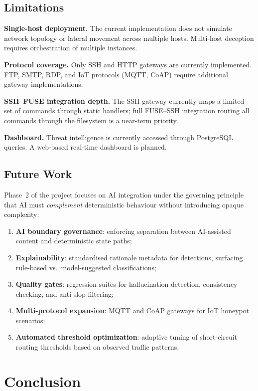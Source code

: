 \documentclass[conference]{IEEEtran}
\begin{document}
\subsection{Limitations}

\textbf{Single-host deployment.}
The current implementation does not simulate network topology or lateral movement across multiple hosts.
Multi-host deception requires orchestration of multiple instances.

\textbf{Protocol coverage.}
Only SSH and HTTP gateways are currently implemented.
FTP, SMTP, RDP, and IoT protocols (MQTT, CoAP) require additional gateway implementations.

\textbf{SSH--FUSE integration depth.}
The SSH gateway currently maps a limited set of commands through static handlers; full FUSE--SSH integration routing all commands through the filesystem is a near-term priority.

\textbf{Dashboard.}
Threat intelligence is currently accessed through PostgreSQL queries.
A web-based real-time dashboard is planned.

\subsection{Future Work}

Phase~2 of the project focuses on AI integration under the governing principle that AI must \emph{complement} deterministic behaviour without introducing opaque complexity:
\begin{enumerate}[noitemsep]
  \item \textbf{AI boundary governance}: enforcing separation between AI-assisted content and deterministic state paths;
  \item \textbf{Explainability}: standardised rationale metadata for detections, surfacing rule-based vs.\ model-suggested classifications;
  \item \textbf{Quality gates}: regression suites for hallucination detection, consistency checking, and anti-slop filtering;
  \item \textbf{Multi-protocol expansion}: MQTT and CoAP gateways for IoT honeypot scenarios;
  \item \textbf{Automated threshold optimization}: adaptive tuning of short-circuit routing thresholds based on observed traffic patterns.
\end{enumerate}

\section{Conclusion}
\label{sec:conclusion}
\end{document}
